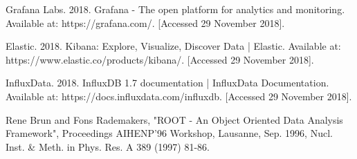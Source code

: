\documentclass{webofc}
\begin{document}
\begin{thebibliography}{plain}
Grafana Labs. 2018. Grafana - The open platform for analytics and monitoring. Available at: https://grafana.com/. [Accessed 29 November 2018].

Elastic. 2018. Kibana: Explore, Visualize, Discover Data | Elastic. Available at: https://www.elastic.co/products/kibana/. [Accessed 29 November 2018].

InfluxData. 2018. InfluxDB 1.7 documentation | InfluxData Documentation. Available at: https://docs.influxdata.com/influxdb. [Accessed 29 November 2018].

Rene Brun and Fons Rademakers, "ROOT - An Object Oriented Data Analysis Framework", Proceedings AIHENP'96 Workshop, Lausanne, Sep. 1996, Nucl. Inst. \& Meth. in Phys. Res. A 389 (1997) 81-86.
\end{thebibliography}
\end{document}

